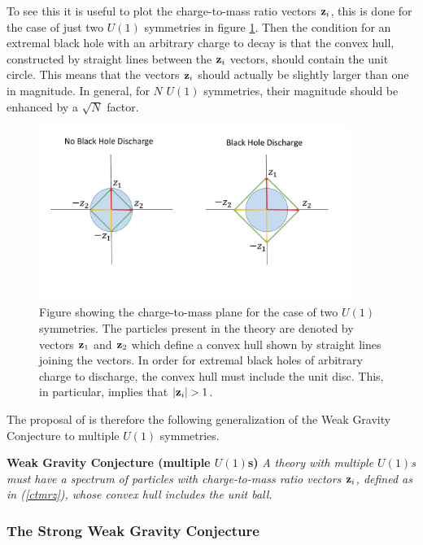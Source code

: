 \documentclass[11pt,a4paper]{article}
\numberwithin{equation}{section}
\numberwithin{table}{section}\setlength{\multlinegap}{25pt}
\begin{document}
To see this it is useful to plot the charge-to-mass ratio vectors ${\bf z}_i$, this is done for the case of just two $U(1)$ symmetries in figure \ref{fig:CH}. Then the condition for an extremal black hole with an arbitrary charge to decay is that the convex hull, constructed by straight lines between the ${\bf z}_i$ vectors, should contain the unit circle. This means that the vectors ${\bf z}_i$ should actually be slightly larger than one in magnitude. In general, for $N$ $U(1)$ symmetries, their magnitude should be enhanced by a $\sqrt{N}$ factor. 
\begin{figure}[t]
\centering
 \includegraphics[width=0.9\textwidth]{FigCH.pdf}
\caption{Figure showing the charge-to-mass plane for the case of two $U(1)$ symmetries. The particles present in the theory are denoted by vectors ${\bf z}_1$ and ${\bf z}_2$ which define a convex hull shown by straight lines joining the vectors. In order for extremal black holes of arbitrary charge to discharge, the convex hull must include the unit disc. This, in particular, implies that $\left|{\bf z}_i\right| > 1$.}
\label{fig:CH}
\end{figure}

The proposal of \cite{Cheung:2014vva} is therefore the following generalization of the Weak Gravity Conjecture to multiple $U(1)$ symmetries.
\begin{tcolorbox}
{\bf Weak Gravity Conjecture (multiple $U(1)$s)} \;\cite{Cheung:2014vva}
{\it 
\newline
\newline
A theory with multiple $U(1)$s must have a spectrum of particles with charge-to-mass ratio vectors ${\bf z}_i$, defined as in (\ref{ctmrz}), whose convex hull includes the unit ball.
}
\end{tcolorbox}


\subsubsection{The Strong Weak Gravity Conjecture}
\label{sec:strongwgc}
\end{document}
